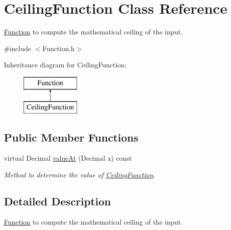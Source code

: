 \hypertarget{class_ceiling_function}{\section{Ceiling\+Function Class Reference}
\label{class_ceiling_function}
}


\hyperlink{class_function}{Function} to compute the mathematical ceiling of the input.  




{\ttfamily \#include $<$Function.\+h$>$}

Inheritance diagram for Ceiling\+Function\+:\begin{figure}[H]
\begin{center}
\leavevmode
\includegraphics[height=2.000000cm]{class_ceiling_function}
\end{center}
\end{figure}
\subsection*{Public Member Functions}
\begin{DoxyCompactItemize}
\item 
virtual Decimal \hyperlink{class_ceiling_function_a5aac31296f54c9af13acfbe2dc8559d2}{value\+At} (Decimal x) const 
\begin{DoxyCompactList}\small\item\em Method to determine the value of \hyperlink{class_ceiling_function}{Ceiling\+Function}. \end{DoxyCompactList}\end{DoxyCompactItemize}


\subsection{Detailed Description}
\hyperlink{class_function}{Function} to compute the mathematical ceiling of the input. 

